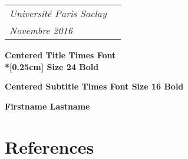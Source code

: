 \documentclass[a4paper,oneside]{bth}
\begin{document}
\pagestyle{plain}


{\pagestyle{empty}
\changepage{5cm}{1cm}{-0.5cm}{-0.5cm}{}{-2cm}{}{}{}
\noindent%
{\small
\begin{tabular}{p{} p{}}
\textit{Université Paris Saclay}\\
\textit{Novembre 2016}\\
\end{tabular}}

\begin{center}

\par\vspace {7cm}

{\Huge\textbf{Centered Title Times Font\\*[0.25cm] Size 24 Bold}}   

\par\vspace {0.5cm}

{\Large\textbf{Centered Subtitle Times Font Size 16 Bold}}                   

\par\vspace {3cm}

{\Large\textbf{Firstname Lastname}}
\par\vspace {7cm}

\end{center}


\clearpage
}


\par\vspace {12cm}


\setcounter{page}{1}




\tableofcontents 

\cleardoublepage
\pagestyle{headings}







	
	
	
	
	




\chapter*{References}


 
\end{document}
